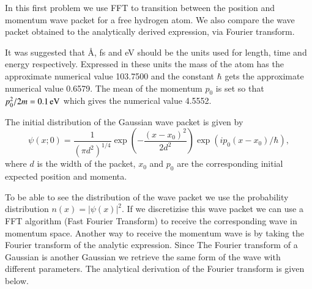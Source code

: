 In this first problem we use FFT to transition between the position and momentum wave packet for a free hydrogen atom. We also compare the wave packet obtained to the analytically derived expression, via Fourier transform.

It was suggested that \AA, fs and eV should be the units used for length, time and energy respectively. Expressed in these units the mass of the atom has the approximate numerical value 103.7500 and the constant $\hbar$ gets the approximate numerical value 0.6579. The mean of the momentum $p_0$ is set so that $p_0^2/2m=\unit[0.1]{eV}$ which gives the numerical value 4.5552.

The initial distribution of the Gaussian wave packet is given by
\begin{equation}
	\psi(x;0)=\frac{1}{(\pi d^2)^{1/4}} \exp\left(-\frac{(x-x_0)^2}{2d^2}\right) \exp(i p_0(x-x_0)/\hbar),
\end{equation}
where $d$ is the width of the packet, $x_0$ and $p_0$ are the corresponding initial expected position and momenta.

To be able to see the distribution of the wave packet we use the probability distribution $n(x)=|\psi(x)|^2$. If we discretizise this wave packet we can use a FFT algorithm (Fast Fourier Transform) to receive the corresponding wave in momentum space. Another way to receive the momentum wave is by taking the Fourier transform of the analytic expression. Since The Fourier transform of a Gaussian is another Gaussian we retrieve the same form of the wave with different parameters. The analytical derivation of the Fourier transform is given below.

